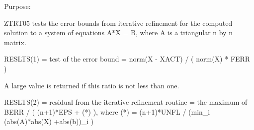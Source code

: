 \begin{DoxyParagraph}{Purpose\+: }
\begin{DoxyVerb} ZTRT05 tests the error bounds from iterative refinement for the
 computed solution to a system of equations A*X = B, where A is a
 triangular n by n matrix.

 RESLTS(1) = test of the error bound
           = norm(X - XACT) / ( norm(X) * FERR )

 A large value is returned if this ratio is not less than one.

 RESLTS(2) = residual from the iterative refinement routine
           = the maximum of BERR / ( (n+1)*EPS + (*) ), where
             (*) = (n+1)*UNFL / (min_i (abs(A)*abs(X) +abs(b))_i )\end{DoxyVerb}
 
\end{DoxyParagraph}

